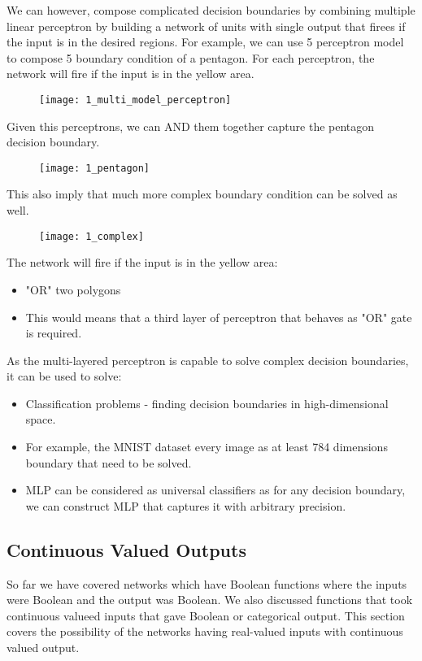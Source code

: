 \hfill\break
We can however, compose complicated decision boundaries by combining multiple linear perceptron by building a network of units with single output that firees if the input is in the desired regions. For example, we can use 5 perceptron model to compose 5 boundary condition of a pentagon. For each perceptron, the network will fire if the input is in the yellow area.

\begin{figure}[H]
	\centering
	\texttt{[image: 1\_multi\_model\_perceptron]}
\end{figure}

\hfill\break
Given this perceptrons, we can AND them together capture the pentagon decision boundary.

\begin{figure}[H]
	\centering
	\texttt{[image: 1\_pentagon]}
\end{figure}

\hfill\break
This also imply that much more complex boundary condition can be solved as well.

\begin{figure}[H]
	\centering
	\texttt{[image: 1\_complex]}
\end{figure}

\hfill\break
The network will fire if the input is in the yellow area:
\begin{itemize}
	\item "OR" two polygons
	\item This would means that a third layer of perceptron that behaves as "OR" gate is required.
\end{itemize}

\hfill\break
As the multi-layered perceptron is capable to solve complex decision boundaries, it can be used to solve:
\begin{itemize}
	\item Classification problems - finding decision boundaries in high-dimensional space.
	\item For example, the MNIST dataset every image as at least 784 dimensions boundary that need to be solved.
	\item MLP can be considered as universal classifiers as for any decision boundary, we can construct MLP that captures it with arbitrary precision.
\end{itemize}

\subsection{Continuous Valued Outputs}
So far we have covered networks which have Boolean functions where the inputs were Boolean and the output was Boolean. We also discussed functions that took continuous valueed inputs that gave Boolean or categorical output. This section covers the possibility of the networks having real-valued inputs with continuous valued output.

